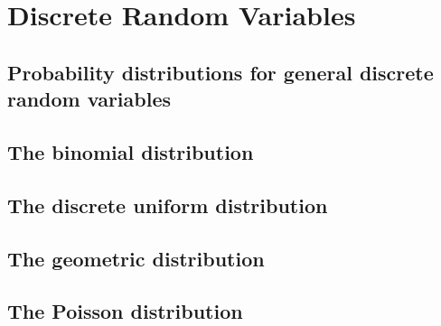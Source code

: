 \chapter{Discrete Random Variables}

\section{Probability distributions for general discrete random variables}
\section{The binomial distribution}
\section{The discrete uniform distribution}
\section{The geometric distribution}
\section{The Poisson distribution}
